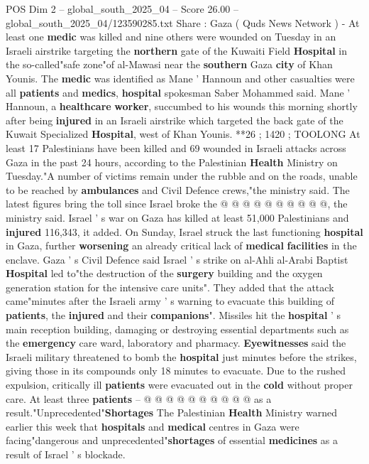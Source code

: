 \begin{textsample}{POS Dim 2 – global\_south\_2025\_04 – Score 26.00 – global\_south\_2025\_04/123590285.txt}  \label{ex:f2_pos_273}
Share : Gaza ( Quds News Network ) - At least one \textbf{medic} was killed and nine others were wounded on Tuesday in an Israeli airstrike targeting the \textbf{northern} gate of the Kuwaiti Field \textbf{Hospital} in the so-called"safe zone"of al-Mawasi near the \textbf{southern} Gaza \textbf{city} of Khan Younis.
The \textbf{medic} was identified as Mane ' Hannoun and other casualties were all \textbf{patients} and \textbf{medics}, \textbf{hospital} spokesman Saber Mohammed said.
Mane ' Hannoun, a \textbf{healthcare} \textbf{worker}, succumbed to his wounds this morning shortly after being \textbf{injured} in an Israeli airstrike which targeted the back gate of the Kuwait Specialized \textbf{Hospital}, west of Khan Younis. **26 ; 1420 ; TOOLONG At least 17 Palestinians have been killed and 69 wounded in Israeli attacks across Gaza in the past 24 hours, according to the Palestinian \textbf{Health} Ministry on Tuesday."A number of victims remain under the rubble and on the roads, unable to be reached by \textbf{ambulances} and Civil Defence crews,"the ministry said.
The latest figures bring the toll since Israel broke the @ @ @ @ @ @ @ @ @ @, the ministry said.
Israel ' s war on Gaza has killed at least 51,000 Palestinians and \textbf{injured} 116,343, it added.
On Sunday, Israel struck the last functioning \textbf{hospital} in Gaza, further \textbf{worsening} an already critical lack of \textbf{medical} \textbf{facilities} in the enclave.
Gaza ' s Civil Defence said Israel ' s strike on al-Ahli al-Arabi Baptist \textbf{Hospital} led to"the destruction of the \textbf{surgery} building and the oxygen generation station for the intensive care units".
They added that the attack came"minutes after the Israeli army ' s warning to evacuate this building of \textbf{patients}, the \textbf{injured} and their \textbf{companions}".
Missiles hit the \textbf{hospital} ' s main reception building, damaging or destroying essential departments such as the \textbf{emergency} care ward, laboratory and pharmacy. \textbf{Eyewitnesses} said the Israeli military threatened to bomb the \textbf{hospital} just minutes before the strikes, giving those in its compounds only 18 minutes to evacuate.
Due to the rushed expulsion, critically ill \textbf{patients} were evacuated out in the \textbf{cold} without proper care.
At least three \textbf{patients} -- @ @ @ @ @ @ @ @ @ @ as a result."Unprecedented"\textbf{Shortages} The Palestinian \textbf{Health} Ministry warned earlier this week that \textbf{hospitals} and \textbf{medical} centres in Gaza were facing"dangerous and unprecedented"\textbf{shortages} of essential \textbf{medicines} as a result of Israel ' s blockade.

\end{textsample}
